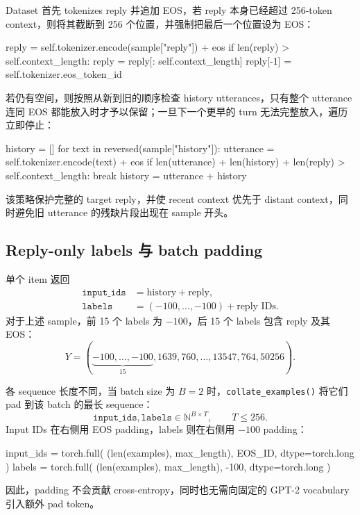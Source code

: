 \documentclass[12pt]{article}
\begin{document}
Dataset 首先 tokenizes reply 并追加 EOS，若 reply 本身已经超过 256-token context，则将其截断到 256 个位置，并强制把最后一个位置设为 EOS：
\begin{pythoncode}[label={lst:reply-truncate}]
reply = self.tokenizer.encode(sample["reply"]) + eos
if len(reply) > self.context_length:
    reply = reply[: self.context_length]
    reply[-1] = self.tokenizer.eos_token_id
\end{pythoncode}

若仍有空间，则按照从新到旧的顺序检查 history utterances，只有整个 utterance 连同 EOS 都能放入时才予以保留；一旦下一个更早的 turn 无法完整放入，遍历立即停止：
\begin{pythoncode}[label={lst:history-truncate}]
history = []
for text in reversed(sample["history"]):
    utterance = self.tokenizer.encode(text) + eos
    if len(utterance) + len(history) + len(reply) > self.context_length:
        break
    history = utterance + history
\end{pythoncode}
该策略保护完整的 target reply，并使 recent context 优先于 distant context，同时避免旧 utterance 的残缺片段出现在 sample 开头。

\subsection{Reply-only labels 与 batch padding}

单个 item 返回
\begin{equation}
\begin{aligned}
\texttt{input\_ids}&=\text{history}+\text{reply},\\
\texttt{labels}&=(-100,\ldots,-100)+\text{reply IDs}.
\end{aligned}
\end{equation}
对于上述 sample，前 15 个 labels 为 $-100$，后 15 个 labels 包含 reply 及其 EOS：
\begin{equation}
Y=(\underbrace{-100,\ldots,-100}_{15},1639,760,\ldots,13547,764,50256).
\end{equation}

各 sequence 长度不同，当 batch size 为 $B=2$ 时，\texttt{collate\_examples()} 将它们 pad 到该 batch 的最长 sequence：
\[
\texttt{input\_ids},\texttt{labels}\in\mathbb N^{B\times T},
\qquad T\leq256.
\]
Input IDs 在右侧用 EOS padding，labels 则在右侧用 $-100$ padding：
\begin{pythoncode}[label={lst:collate}]
input_ids = torch.full(
    (len(examples), max_length), EOS_ID, dtype=torch.long
)
labels = torch.full(
    (len(examples), max_length), -100, dtype=torch.long
)
\end{pythoncode}
因此，padding 不会贡献 cross-entropy，同时也无需向固定的 GPT-2 vocabulary 引入额外 pad token。
\end{document}
